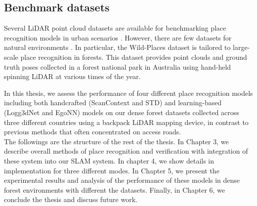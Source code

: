 \subsection*{Benchmark datasets} 
Several LiDAR point cloud datasets are available for benchmarking place recognition models in urban scenarios \cite{maddern2017ijrr, behley2019iccv, kim2020icra}. However, there are few datasets  for natural environments \cite{triest2022icra, knights2023icra}. In particular, the Wild-Places dataset \cite{knights2023icra} is tailored to large-scale place recognition in forests. This dataset provides point clouds and ground truth poses collected in a forest national park in Australia using hand-held spinning LiDAR at various times of the year. 

In this thesis, we assess the performance of four different place recognition models including both handcrafted (ScanContext and STD) and learning-based (Logg3dNet and EgoNN) models on our dense forest datasets collected across three different countries using a backpack LiDAR mapping device, in contrast to previous methods that often concentrated on access roads. \\

The followings are the structure of the rest of the thesis. In Chapter 3, we describe overall methods of place recognition and verification with integration of these system into our SLAM system. In chapter 4, we show details in implementation for three different modes. In Chapter 5, we present the experimental results and analysis of the performance of these models in dense forest environments with different the datasets.  Finally, in Chapter 6, we conclude the thesis and discuss future work.



